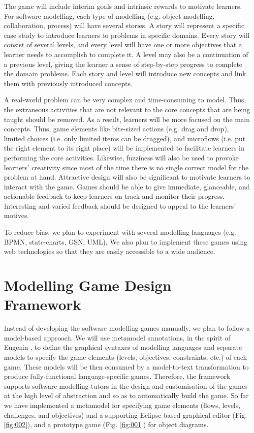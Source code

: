 \documentclass[runningheads,a4paper]{llncs}
\begin{document}
The game will include interim goals and intrinsic rewards to motivate learners. For software modelling, each type of modelling (e.g. object modelling, collaboration, process) will have several stories. A story will represent a specific case study to introduce learners to problems in specific domains. Every story will consist of several levels, and every level will have one or more objectives that a learner needs to accomplish to complete it. A level may also be a continuation of a previous level, giving the learner a sense of step-by-step progress to complete the domain problems. Each story and level will introduce new concepts and link them with previously introduced concepts.

A real-world problem can be very complex and time-consuming to model. Thus, the extraneous activities that are not relevant to the core concepts that are being taught should be removed. As a result, learners will be more focused on the main concepts. Thus, game elements like bite-sized actions (e.g. drag and drop), limited choices (i.e. only limited items can be dragged), and microflows (i.e. put the right element to its right place) will be implemented to facilitate learners in performing the core activities. Likewise, fuzziness will also be used to provoke learners' creativity since most of the time there is no single correct model for the problem at hand. Attractive design will also be significant to motivate learners to interact with the game. Games should be able to give immediate, glanceable, and actionable feedback to keep learners on track and monitor their progress. Interesting and varied feedback should be designed to appeal to the learners' motives. 

To reduce bias, we plan to experiment with several modelling languages (e.g. BPMN, state-charts, GSN, UML). We also plan to implement these games using web technologies so that they are easily accessible to a wide audience.

\section{Modelling Game Design Framework}
Instead of developing the software modelling games manually, we plan to follow a model-based approach. We will use metamodel annotations, in the spirit of Eugenia \cite{kolovos2015eugenia}, to define the graphical syntaxes of modelling languages and separate models to specify the game elements (levels, objectives, constraints, etc.) of each game. These models will be then consumed by a model-to-text transformation to produce fully-functional language-specific games. Therefore, the framework supports software modelling tutors in the design and customisation of the games at the high level of abstraction and so as to automatically build the game. So far we have implemented a metamodel for specifying game elements (flows, levels, challenges, and objectives) and a supporting Eclipse-based graphical editor (Fig. \ref{fig:002}), and a prototype game (Fig. \ref{fig:001}) for object diagrams. 
\end{document}
